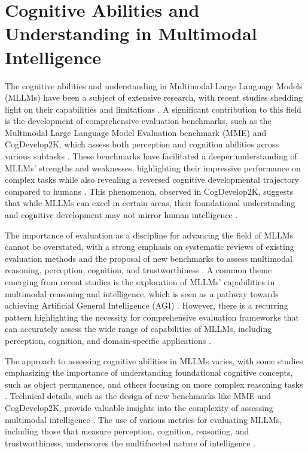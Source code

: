 \documentclass[conference]{IEEEtran}
\begin{document}
\section{Cognitive Abilities and Understanding in Multimodal Intelligence}
The cognitive abilities and understanding in Multimodal Large Language Models (MLLMs) have been a subject of extensive research, with recent studies shedding light on their capabilities and limitations \cite{b1}. A significant contribution to this field is the development of comprehensive evaluation benchmarks, such as the Multimodal Large Language Model Evaluation benchmark (MME) and CogDevelop2K, which assess both perception and cognition abilities across various subtasks \cite{b2}. These benchmarks have facilitated a deeper understanding of MLLMs' strengths and weaknesses, highlighting their impressive performance on complex tasks while also revealing a reversed cognitive developmental trajectory compared to humans \cite{b3}. This phenomenon, observed in CogDevelop2K, suggests that while MLLMs can excel in certain areas, their foundational understanding and cognitive development may not mirror human intelligence \cite{b4}.

The importance of evaluation as a discipline for advancing the field of MLLMs cannot be overstated, with a strong emphasis on systematic reviews of existing evaluation methods and the proposal of new benchmarks to assess multimodal reasoning, perception, cognition, and trustworthiness \cite{b5}. A common theme emerging from recent studies is the exploration of MLLMs' capabilities in multimodal reasoning and intelligence, which is seen as a pathway towards achieving Artificial General Intelligence (AGI) \cite{b6}. However, there is a recurring pattern highlighting the necessity for comprehensive evaluation frameworks that can accurately assess the wide range of capabilities of MLLMs, including perception, cognition, and domain-specific applications \cite{b7}.

The approach to assessing cognitive abilities in MLLMs varies, with some studies emphasizing the importance of understanding foundational cognitive concepts, such as object permanence, and others focusing on more complex reasoning tasks \cite{b8}. Technical details, such as the design of new benchmarks like MME and CogDevelop2K, provide valuable insights into the complexity of assessing multimodal intelligence \cite{b9}. The use of various metrics for evaluating MLLMs, including those that measure perception, cognition, reasoning, and trustworthiness, underscores the multifaceted nature of intelligence \cite{b10}.
\end{document}
